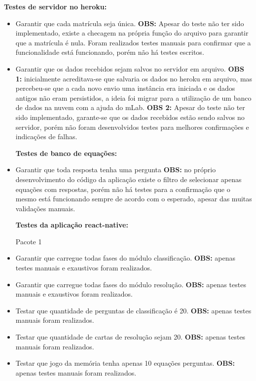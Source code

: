 \textbf{Testes de servidor no heroku:}
\begin{itemize}
	\item Garantir que cada matrícula seja única. \textbf{OBS:} Apesar do teste não ter sido implementado, existe a checagem na própria função do arquivo para garantir que a matrícula é nula. Foram realizados testes manuais para confirmar que a funcionalidade está funcionando, porém não há testes escritos.  


\item Garantir que os dados recebidos sejam salvos no servidor em arquivo. \textbf{OBS 1:} inicialmente acreditava-se que salvaria os dados no heroku em arquivo, mas percebeu-se que a cada novo envio uma instância era iniciada e os dados antigos não eram persistidos, a ideia foi migrar para a utilização de um banco de dados na nuvem com a ajuda do mLab. \textbf{OBS 2:} Apesar do teste não ter sido implementado, garante-se que os dados recebidos estão sendo salvos no servidor, porém não foram desenvolvidos testes para melhores confirmações e indicações de falhas.  


\textbf{Testes de banco de equações:}
\item Garantir que toda resposta tenha uma pergunta \textbf{OBS:} no próprio desenvolvimento do código da aplicação existe o filtro de selecionar apenas equações com respostas, porém não há testes para a confirmação que o mesmo está funcionando sempre de acordo com o esperado, apesar das muitas validações manuais.  


\textbf{Testes da aplicação react-native:}

	Pacote 1
\item Garantir que carregue todas fases do módulo classificação. \textbf{OBS:} apenas testes manuais e exaustivos foram realizados.  

\item Garantir que carregue todas fases do módulo resolução. \textbf{OBS:} apenas testes manuais e exaustivos foram realizados.  

\item Testar que quantidade de perguntas de classificação é 20. \textbf{OBS:} apenas testes manuais foram realizados.  

\item Testar que quantidade de cartas de resolução sejam 20. \textbf{OBS:} apenas testes manuais foram realizados.  

\item Testar que jogo da memória tenha apenas 10 equações perguntas. \textbf{OBS:} apenas testes manuais foram realizados.  


\end{itemize}
